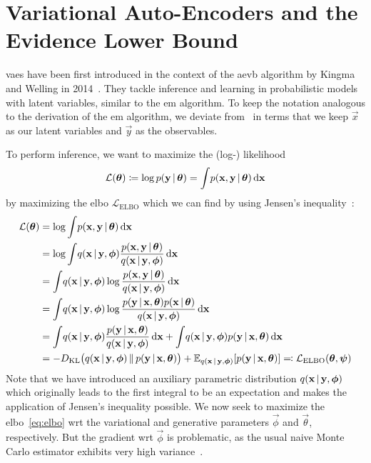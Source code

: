 	\section{Variational Auto-Encoders and the Evidence Lower Bound}
		\acp{vae} have been first introduced in the context of the \ac{aevb} algorithm by Kingma and Welling in 2014~\cite{kingmaAutoEncodingVariationalBayes2014}. They tackle inference and learning in probabilistic models with latent variables, similar to the \ac{em} algorithm. To keep the notation analogous to the derivation of the \ac{em} algorithm, we deviate from~\cite{kingmaAutoEncodingVariationalBayes2014} in terms that we keep \(\vec{x}\) as our latent variables and \(\vec{y}\) as the observables.

		To perform inference, we want to maximize the (log-) likelihood
		\begin{align*}
			\mathcal{L}(\boldsymbol{\mathrm{\theta}}) \coloneqq \log p(\boldsymbol{\mathrm{y}} \,\vert\, \boldsymbol{\mathrm{\theta}}) = \int\! p(\boldsymbol{\mathrm{x}}, \boldsymbol{\mathrm{y}} \,\vert\, \boldsymbol{\mathrm{\theta}}) \dd{\boldsymbol{\mathrm{x}}}
		\end{align*}
		by maximizing the \ac{elbo} \( \mathcal{L}_\mathrm{ELBO} \) which we can find by using Jensen's inequality~\cite{jensenFonctionsConvexesInegalites1906}:
		\begin{align}
			\mathcal{L}(\boldsymbol{\mathrm{\theta}})
				&= \log \int\! p(\boldsymbol{\mathrm{x}}, \boldsymbol{\mathrm{y}} \,\vert\, \boldsymbol{\mathrm{\theta}}) \dd{\boldsymbol{\mathrm{x}}}  \nonumber \\
				&= \log \int\! q(\boldsymbol{\mathrm{x}} \,\vert\, \boldsymbol{\mathrm{y}}, \boldsymbol{\mathrm{\phi}}) \frac{p(\boldsymbol{\mathrm{x}}, \boldsymbol{\mathrm{y}} \,\vert\, \boldsymbol{\mathrm{\theta}})}{q(\boldsymbol{\mathrm{x}} \,\vert\, \boldsymbol{\mathrm{y}}, \boldsymbol{\mathrm{\phi}})} \dd{\boldsymbol{\mathrm{x}}}  \nonumber \\
				&= \int\! q(\boldsymbol{\mathrm{x}} \,\vert\, \boldsymbol{\mathrm{y}}, \boldsymbol{\mathrm{\phi}}) \log \frac{p(\boldsymbol{\mathrm{x}}, \boldsymbol{\mathrm{y}} \,\vert\, \boldsymbol{\mathrm{\theta}})}{q(\boldsymbol{\mathrm{x}} \,\vert\, \boldsymbol{\mathrm{y}}, \boldsymbol{\mathrm{\phi}})} \dd{\boldsymbol{\mathrm{x}}}  \nonumber \\
				&= \int\! q(\boldsymbol{\mathrm{x}} \,\vert\, \boldsymbol{\mathrm{y}}, \boldsymbol{\mathrm{\phi}}) \log \frac{p(\boldsymbol{\mathrm{y}} \,\vert\, \boldsymbol{\mathrm{x}}, \boldsymbol{\mathrm{\theta}}) p(\boldsymbol{\mathrm{x}} \,\vert\, \boldsymbol{\mathrm{\theta}})}{q(\boldsymbol{\mathrm{x}} \,\vert\, \boldsymbol{\mathrm{y}}, \boldsymbol{\mathrm{\phi}})} \dd{\boldsymbol{\mathrm{x}}}  \nonumber \\
				&= \int\! q(\boldsymbol{\mathrm{x}} \,\vert\, \boldsymbol{\mathrm{y}}, \boldsymbol{\mathrm{\phi}}) \frac{p(\boldsymbol{\mathrm{y}} \,\vert\, \boldsymbol{\mathrm{x}}, \boldsymbol{\mathrm{\theta}})}{q(\boldsymbol{\mathrm{x}} \,\vert\, \boldsymbol{\mathrm{y}}, \boldsymbol{\mathrm{\phi}})} \dd{\boldsymbol{\mathrm{x}}} + \int\! q(\boldsymbol{\mathrm{x}} \,\vert\, \boldsymbol{\mathrm{y}}, \boldsymbol{\mathrm{\phi}}) p(\boldsymbol{\mathrm{y}} \,\vert\, \boldsymbol{\mathrm{x}}, \boldsymbol{\mathrm{\theta}}) \dd{\boldsymbol{\mathrm{x}}}  \nonumber \\
				&= -D_\mathrm{KL}\big( q(\boldsymbol{\mathrm{x}} \,\vert\, \boldsymbol{\mathrm{y}}, \boldsymbol{\mathrm{\phi}}) \,\Vert\, p(\boldsymbol{\mathrm{y}} \,\vert\, \boldsymbol{\mathrm{x}}, \boldsymbol{\mathrm{\theta}}) \big) + \mathbb{E}_{q(\boldsymbol{\mathrm{x}} \,\vert\, \boldsymbol{\mathrm{y}}, \boldsymbol{\mathrm{\phi}})}[p(\boldsymbol{\mathrm{y}} \,\vert\, \boldsymbol{\mathrm{x}}, \boldsymbol{\mathrm{\theta}})] \eqqcolon \mathcal{L}_\mathrm{ELBO}(\boldsymbol{\mathrm{\theta}}, \boldsymbol{\mathrm{\psi}})  \label{eq:elbo}
		\end{align}
		Note that we have introduced an auxiliary parametric distribution \( q(\boldsymbol{\mathrm{x}} \,\vert\, \boldsymbol{\mathrm{y}}, \boldsymbol{\mathrm{\phi}}) \) which originally leads to the first integral to be an expectation and makes the application of Jensen's inequality possible. We now seek to maximize the \ac{elbo}~\eqref{eq:elbo} \ac{wrt} the variational and generative parameters \(\vec{\phi}\) and \(\vec{\theta}\), respectively. But the gradient \ac{wrt} \(\vec{\phi}\) is problematic, as the usual naive Monte Carlo estimator exhibits very high variance~\cite{kingmaAutoEncodingVariationalBayes2014,paisleyVariationalBayesianInference2012a}.

